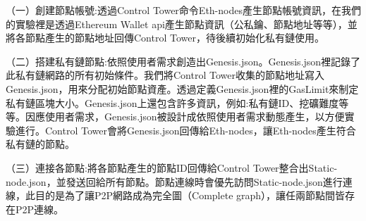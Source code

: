 （一）創建節點帳號:透過Control Tower命令Eth-nodes產生節點帳號資訊，在我們的實驗裡是透過Ethereum Wallet api產生節點資訊（公私鑰、節點地址等等），並將各節點產生的節點地址回傳Control Tower，待後續初始化私有鏈使用。

（二）搭建私有鏈節點:依照使用者需求創造出Genesis.json。Genesis.json裡記錄了此私有鏈網路的所有初始條件。我們將Control Tower收集的節點地址寫入Genesis.json，用來分配初始節點資產。透過定義Genesis.json裡的GasLimit來制定私有鏈區塊大小。Genesis.json上還包含許多資訊，例如:私有鏈ID、挖礦難度等等。因應使用者需求，Genesis.json被設計成依照使用者需求動態產生，以方便實驗進行。Control Tower會將Genesis.json回傳給Eth-nodes，讓Eth-nodes產生符合私有鏈的節點。

（三）連接各節點:將各節點產生的節點ID回傳給Control Tower整合出Static-node.json，並發送回給所有節點。節點連線時會優先訪問Static-node.json進行連線，此目的是為了讓P2P網路成為完全圖（Complete graph），讓任兩節點間皆存在P2P連線。




 


